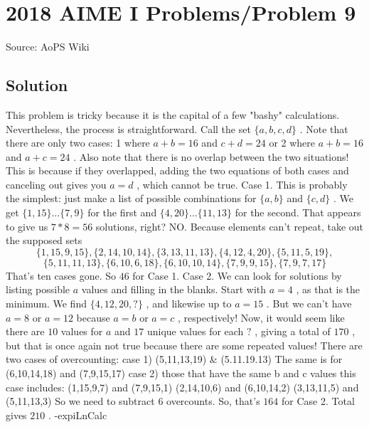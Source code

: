 \documentclass[12pt]{article}
\begin{document}
\section*{{2018 AIME I Problems/Problem 9}}
Source: AoPS Wiki

\subsection*{Solution}
This problem is tricky because it is the capital of a few "bashy" calculations. Nevertheless, the process is straightforward. Call the set $\{a, b, c, d\}$ . Note that there are only two cases: 1 where $a + b = 16$ and $c + d = 24$ or 2 where $a + b = 16$ and $a + c = 24$ . Also note that there is no overlap between the two situations! This is because if they overlapped, adding the two equations of both cases and canceling out gives you $a=d$ , which cannot be true. Case 1.
This is probably the simplest: just make a list of possible combinations for $\{a, b\}$ and $\{c, d\}$ . We get $\{1, 15\}\dots\{7, 9\}$ for the first and $\{4, 20\}\dots\{11, 13\}$ for the second. That appears to give us $7*8=56$ solutions, right? NO. Because elements can't repeat, take out the supposed sets \[\{1, 15, 9, 15\}, \{2, 14, 10, 14\}, \{3, 13, 11, 13\}, \{4, 12, 4, 20\}, \{5, 11, 5, 19\},\] \[\{5, 11, 11, 13\}, \{6, 10, 6, 18\}, \{6, 10, 10, 14\}, \{7, 9, 9, 15\}, \{7, 9, 7, 17\}\] That's ten cases gone. So $46$ for Case 1. Case 2.
We can look for solutions by listing possible $a$ values and filling in the blanks. Start with $a=4$ , as that is the minimum. We find $\{4, 12, 20, ?\}$ , and likewise up to $a=15$ . But we can't have $a=8$ or $a=12$ because $a=b$ or $a=c$ , respectively! Now, it would seem like there are $10$ values for $a$ and $17$ unique values for each $?$ , giving a total of $170$ , but that is once again not true because there are some repeated values!
There are two cases of overcounting: case 1) (5,11,13,19) & (5.11.19.13) The same is for (6,10,14,18) and (7,9,15,17) case 2) those that have the same b and c values this case includes: (1,15,9,7) and (7,9,15,1) (2,14,10,6) and (6,10,14,2) (3,13,11,5) and (5,11,13,3) So we need to subtract 6 overcounts.
So, that's $164$ for Case 2. Total gives $\boxed{210}$ . -expiLnCalc
\end{document}
